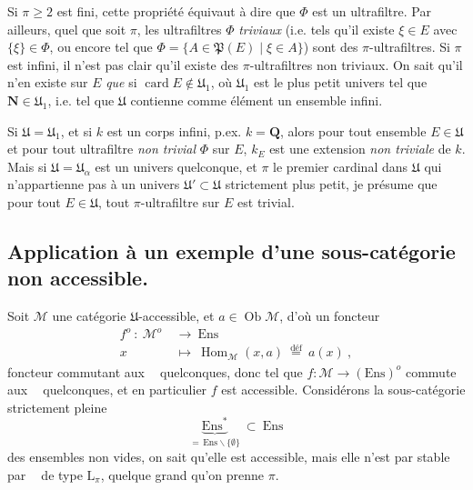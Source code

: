 \documentclass[11pt]{article}
\newcommand{\printedpage}[1]{\marginpar{\footnotesize p.~#1}}
\newcommand{\msp}[1]{\marginpar{\footnotesize [#1]}}
\newcommand{\limind}{\mathop{\underrightarrow{\mathrm{lim}}}}
\newcommand{\limproj}{\mathop{\underleftarrow{\mathrm{lim}}}}
\begin{document}
Si $\pi\geqslant 2$ est fini, cette propriété équivaut à dire que $\Phi$ est un ultrafiltre. Par ailleurs, quel que soit $\pi$, les ultrafiltres $\Phi$ \textit{triviaux} (i.e. tels qu'il existe $\xi\in E$ avec $\{\xi\}\in\Phi$, ou encore tel que $\Phi=\{A\in\mathfrak{P}(E)\mid\xi\in A\}$) sont des $\pi$-ultrafiltres. Si $\pi$ est infini, il n'est pas clair qu'il existe des $\pi$-ultrafiltres non triviaux. On sait qu'il n'en existe sur $E$ \textit{que} si $\operatorname{card}E\notin\mathfrak{U}_1$, où $\mathfrak{U}_1$ est le plus petit univers tel que $\mathbf{N}\in\mathfrak{U}_1$, i.e. tel
\msp{page 11}
que $\mathfrak{U}$ contienne comme élément un ensemble infini.

Si $\mathfrak{U}=\mathfrak{U}_1$, et si $k$ est un corps infini, p.ex. $k=\mathbf{Q}$, alors pour tout ensemble $E\in\mathfrak{U}$ et pour tout ultrafiltre \textit{non trivial} $\Phi$ sur $E$, $k_E$ est une extension \textit{non triviale} de $k$. Mais si $\mathfrak{U}=\mathfrak{U}_\alpha$ est un univers quelconque, et $\pi$ le premier cardinal dans $\mathfrak{U}$ qui n'appartienne pas à un univers $\mathfrak{U}'\subset\mathfrak{U}$ strictement plus petit, je présume que pour tout $E\in\mathfrak{U}$, tout $\pi$-ultrafiltre sur $E$ est trivial. %

\printedpage{196}

\subsection*{Application à un exemple d'une sous-catégorie non accessible.}

Soit $\mathcal{M}$ une catégorie $\mathfrak{U}$-accessible, et $a\in\operatorname{Ob}\mathcal{M}$, d'où un foncteur
\[
\begin{aligned}
f^o\ :\ \mathcal{M}^o\ &\longrightarrow\ \mathrm{Ens}\\
x\ &\longmapsto\ \operatorname{Hom}_{\mathcal{M}}(x,a)\ \overset{\text{déf}}{=}\ a(x)\ ,
\end{aligned}
\]
foncteur commutant aux $\limproj$ quelconques, donc tel que $f:\mathcal{M}\longrightarrow(\mathrm{Ens})^o$ commute aux $\limind$ quelconques, et en particulier $f$ est accessible. Considérons la sous-catégorie strictement pleine
\msp{page 12}
\[
\underbrace{\mathrm{Ens}^*}_{=\,\mathrm{Ens}\backslash\{\emptyset\}}\ \subset\ \mathrm{Ens}
\]
des ensembles non vides, on sait qu'elle est accessible, mais elle n'est par stable par $\limproj$ de type $\mathrm{L}_\pi$, quelque grand qu'on prenne $\pi$. %
\end{document}

